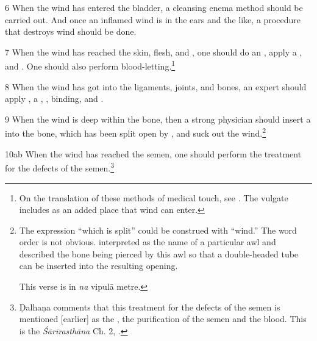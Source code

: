 \begin{translation}
    \item [6] When the wind has entered the bladder, a cleansing enema method
should be carried out. And once an inflamed wind is in the ears and the like,
a procedure that destroys wind should be done.

    \item [7]
    When the wind has reached the skin, flesh, and , one should do 
    an 
    , apply a ,  
     and . One should also 
    perform blood-letting.\footnote{On the translation of these methods of 
    medical touch, see \cite[ch.\,4]{broo-2021}.  The vulgate includes 
     as an added place that wind can enter.}

    \item[8]
    When the wind has got into the ligaments, joints, and bones, an expert 
    should apply  ,  a ,
    , binding, and .


    \item [9] When the wind is deep within the bone, then a strong physician
should insert a  into the bone, which has been split open by
, and suck out the wind.\footnote{The
    expression “which is split” could be construed with “wind.”  The word order
    is not obvious.   interpreted  as the
    name of a particular awl and described the bone being pierced by this awl so
    that a double-headed tube can be inserted into the resulting opening.
    
    This verse is in \emph{na} vipulā metre.}
         
         
          

    \item[10ab]
    When the wind has reached the semen, one should perform the treatment 
    for the defects of the semen.\footnote{Ḍalhaṇa comments 
    \citep[421]{vulgate} that this treatment for the defects of the semen is 
    mentioned [earlier] as the , the purification of the 
    semen and the blood. This is the \emph{Śārīrasthāna} Ch. 2, 
    .}
    

\end{translation}
